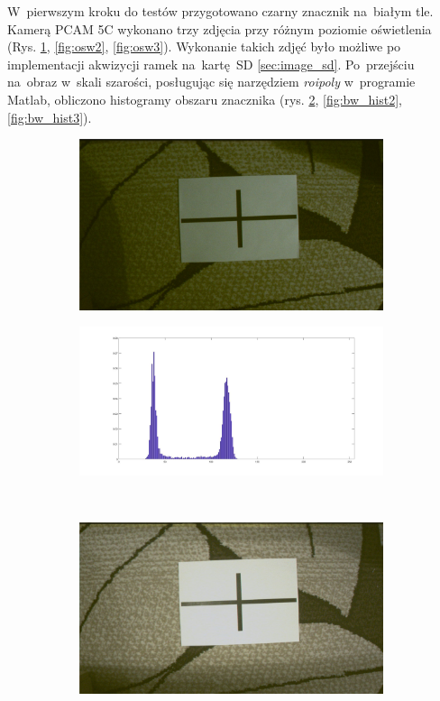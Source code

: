 W~pierwszym kroku do testów przygotowano czarny znacznik na~białym tle. 
Kamerą PCAM 5C wykonano trzy zdjęcia przy różnym poziomie oświetlenia (Rys. \ref{fig:osw1}, \ref{fig:osw2}, \ref{fig:osw3}). Wykonanie takich zdjęć było możliwe po implementacji akwizycji ramek na~kartę~SD \ref{sec:image_sd}. %
Po~przejściu na~obraz w~skali szarości, posługując się narzędziem \textit{roipoly} w~programie Matlab, obliczono histogramy obszaru znacznika (rys. \ref{fig:bw_hist1}, \ref{fig:bw_hist2}, \ref{fig:bw_hist3}).\\
\begin{figure}
	\centering
	\begin{subfigure}{0.4\textwidth}
		\centering
		\includegraphics[width=0.98\textwidth]{rgb_ciemny.jpg}
		\caption{}
		\label{fig:osw1}
	\end{subfigure}%
	\begin{subfigure}{0.55\textwidth}
		\centering
		\includegraphics[width=0.98\textwidth]{bw_hist1.jpg}
		\caption{}
		\label{fig:bw_hist1}
	\end{subfigure}\\
	\begin{subfigure}{0.4\textwidth}
		\centering
		\includegraphics[width=0.98\textwidth]{rgb_sredni.jpg}

\end{subfigure}
\end{figure}
